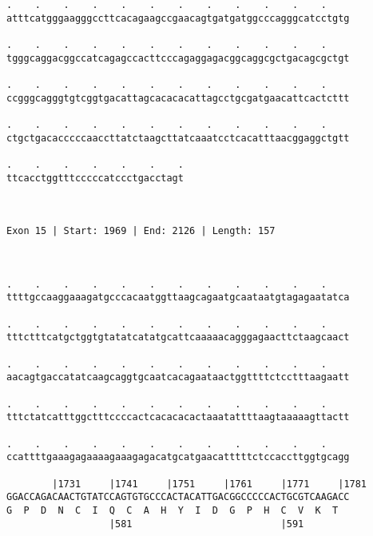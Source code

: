 \documentclass{article}
\begin{document}
\begin{Verbatim}
.    .    .    .    .    .    .    .    .    .    .    .    
atttcatgggaagggccttcacagaagccgaacagtgatgatggcccagggcatcctgtg
                                                            
.    .    .    .    .    .    .    .    .    .    .    .    
tgggcaggacggccatcagagccacttcccagaggagacggcaggcgctgacagcgctgt
                                                            
.    .    .    .    .    .    .    .    .    .    .    .    
ccgggcagggtgtcggtgacattagcacacacattagcctgcgatgaacattcactcttt
                                                            
.    .    .    .    .    .    .    .    .    .    .    .    
ctgctgacacccccaaccttatctaagcttatcaaatcctcacatttaacggaggctgtt
                                                            
.    .    .    .    .    .    .
ttcacctggtttcccccatccctgacctagt
                               
                               
 
Exon 15 | Start: 1969 | End: 2126 | Length: 157



.    .    .    .    .    .    .    .    .    .    .    .    
ttttgccaaggaaagatgcccacaatggttaagcagaatgcaataatgtagagaatatca
                                                            
.    .    .    .    .    .    .    .    .    .    .    .    
tttctttcatgctggtgtatatcatatgcattcaaaaacagggagaacttctaagcaact
                                                            
.    .    .    .    .    .    .    .    .    .    .    .    
aacagtgaccatatcaagcaggtgcaatcacagaataactggttttctcctttaagaatt
                                                            
.    .    .    .    .    .    .    .    .    .    .    .    
tttctatcatttggctttccccactcacacacactaaatattttaagtaaaaagttactt
                                                            
.    .    .    .    .    .    .    .    .    .    .    .    
ccattttgaaagagaaaagaaagagacatgcatgaacatttttctccaccttggtgcagg
                                                            
        |1731     |1741     |1751     |1761     |1771     |1781
GGACCAGACAACTGTATCCAGTGTGCCCACTACATTGACGGCCCCCACTGCGTCAAGACC
G  P  D  N  C  I  Q  C  A  H  Y  I  D  G  P  H  C  V  K  T  
                  |581                          |591        
  

\end{Verbatim}
\end{document}
